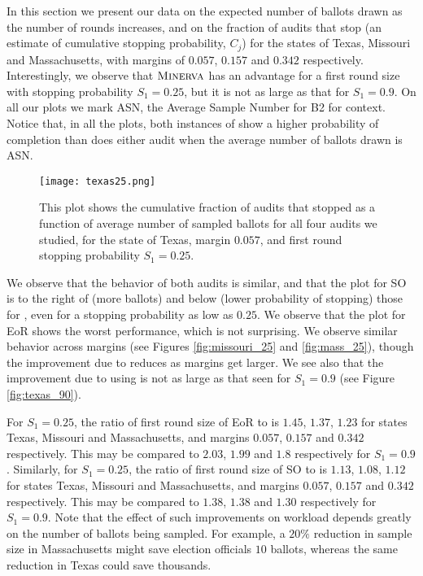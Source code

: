 In this section we present our data on the expected number of ballots drawn as the number of rounds increases, and on the fraction of audits that stop (an estimate of cumulative stopping probability, $C_j$) for the states of Texas, Missouri and Massachusetts, with margins of $0.057$, $0.157$ and $0.342$ respectively. Interestingly, we observe that $\textsc{Minerva}$ has an advantage for a first round size with stopping probability $S_1=0.25$, but it is not as large as that for $S_1=0.9$. On all our plots we mark ASN, the Average Sample Number for B2 \BRAVO for context. Notice that, in all the plots, both instances of \Minerva show a higher probability of completion than does either \BRAVO audit when the average number of ballots drawn is ASN. 

\begin{figure}
\begin{centering}
\texttt{[image: texas25.png]}
\caption{This plot shows the cumulative fraction of audits that stopped as a function of average number of sampled ballots for all four audits we studied, for the state of Texas, margin $0.057$, and first round stopping probability $S_1=0.25$.}
\label{fig:texas_25}
\end{centering}
\end{figure}

We observe that the behavior of both \Minerva audits is similar, and that the plot for SO \BRAVO is to the right of (more ballots) and below (lower probability of stopping) those for \Minerva, even for a stopping probability as low as $0.25$. We observe that the plot for EoR \BRAVO shows the worst performance, which is not surprising. We observe similar behavior across margins (see Figures \ref{fig:missouri_25} and \ref{fig:mass_25}), though the improvement due to \Minerva reduces as margins get larger. We see also that the improvement due to using \Minerva is not as large as that seen for $S_1=0.9$ (see Figure \ref{fig:texas_90}). 

For $S_1=0.25$, the ratio of first round size of EoR \BRAVO to \Minerva is $1.45$, $1.37$, $1.23$ for states Texas, Missouri and Massachusetts, and margins $0.057$, $0.157$ and $0.342$ respectively. This may be compared to $2.03$, $1.99$ and $1.8$ respectively for $S_1=0.9$. Similarly, for $S_1=0.25$, the ratio of first round size of SO \BRAVO to \Minerva is $1.13$, $1.08$, $1.12$ for states Texas, Missouri and Massachusetts, and margins $0.057$, $0.157$ and $0.342$ respectively. This may be compared to $1.38$, $1.38$ and $1.30$ respectively for $S_1=0.9$. Note that the effect of such improvements on workload depends greatly on the number of ballots being sampled. For example, a $20\%$ reduction in sample size in Massachusetts might save election officials $10$ ballots, whereas the same reduction in Texas could save thousands.


